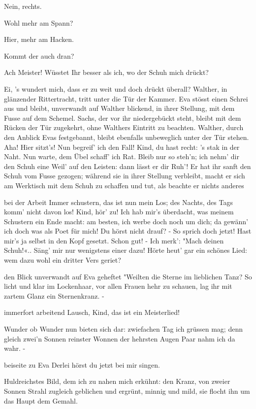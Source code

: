 \begin{drama}
\Evaspeaks
Nein, rechts.

\Sachsspeaks
Wohl mehr am Spann?

\Evaspeaks
Hier, mehr am Hacken.

\Sachsspeaks
Kommt der auch dran?

\Evaspeaks
Ach Meister! Wüsstet Ihr besser als ich,
wo der Schuh mich drückt?

\Sachsspeaks
Ei, 's wundert mich,
dass er zu weit und doch drückt überall?
Walther, in glänzender Rittertracht, tritt unter die Tür der Kammer. Eva stösst einen Schrei aus und bleibt, unverwandt auf Walther blickend, in ihrer Stellung, mit dem Fusse auf dem Schemel. Sachs, der vor ihr niedergebückt steht, bleibt mit dem Rücken der Tür zugekehrt, ohne Walthers Eintritt zu beachten. Walther, durch den Anblick Evas festgebannt, bleibt ebenfalls unbeweglich unter der Tür stehen.
Aha! Hier sitzt's! Nun begreif' ich den Fall!
Kind, du hast recht:
's stak in der Naht.
Nun warte, dem Übel schaff' ich Rat.
Bleib nur so steh'n; ich nehm' dir den Schuh
eine Weil' auf den Leisten:
dann lässt er dir Ruh'!
Er hat ihr sanft den Schuh vom Fusse gezogen; während sie in ihrer Stellung verbleibt, macht er sich am Werktisch mit dem Schuh zu schaffen und tut, als beachte er nichts anderes

\Sachsspeaks
bei der Arbeit
Immer schustern, das ist nun mein Los;
des Nachts, des Tags komm' nicht davon los!
Kind, hör' zu! Ich hab mir's überdacht,
was meinem Schustern ein Ende macht:
am besten, ich werbe doch noch um dich;
da gewänn' ich doch was als Poet für mich!
Du hörst nicht drauf? - So sprich doch jetzt!
Hast mir's ja selbst in den Kopf gesetzt.
Schon gut! - Ich merk':
"Mach deinen Schuh!«..
Säng' mir nur wenigstens einer dazu!
Hörte heut' gar ein schönes Lied:
wem dazu wohl ein dritter Vers geriet?

\Waltherspeaks
den Blick unverwandt auf Eva geheftet
"Weilten die Sterne im lieblichen Tanz?
So licht und klar im Lockenhaar,
vor allen Frauen hehr zu schauen,
lag ihr mit zartem Glanz ein Sternenkranz. -

\Sachsspeaks
immerfort arbeitend
Lausch, Kind, das ist ein Meisterlied!

\Waltherspeaks
Wunder ob Wunder nun bieten sich dar:
zwiefachen Tag ich grüssen mag;
denn gleich zwei'n Sonnen reinster Wonnen
der hehrsten Augen Paar nahm ich da wahr. -

\Sachsspeaks
beiseite zu Eva
Derlei hörst du jetzt bei mir singen.

\Waltherspeaks
Huldreichstes Bild,
dem ich zu nahen mich erkühnt:
den Kranz, von zweier Sonnen Strahl
zugleich geblichen und ergrünt,
minnig und mild,
sie flocht ihn um das Haupt dem Gemahl.


\end{drama}
